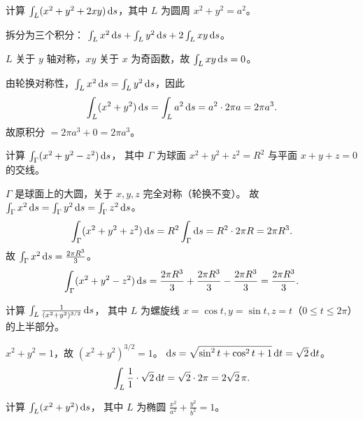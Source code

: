 \documentclass{article}
\begin{document}
\begin{exercise}
  计算 $\int_L (x^2 + y^2 + 2xy) \,\mathrm{d} s$，其中 $L$ 为圆周 $x^2+y^2=a^2$。
\end{exercise}

\begin{solution}
  拆分为三个积分：
  $\int_L x^2\,\mathrm{d} s + \int_L y^2\,\mathrm{d} s + 2\int_L xy\,\mathrm{d} s$。

  $L$ 关于 $y$ 轴对称，$xy$ 关于 $x$ 为奇函数，故 $\int_L xy\,\mathrm{d} s = 0$。

  由轮换对称性，$\int_L x^2\,\mathrm{d} s = \int_L y^2\,\mathrm{d} s$，因此
  \[
    \int_L (x^2+y^2)\,\mathrm{d} s = \int_L a^2 \,\mathrm{d} s = a^2 \cdot 2\pi a = 2\pi a^3.
  \]
  故原积分 $= 2\pi a^3 + 0 = 2\pi a^3$。
\end{solution}

\begin{exercise}
  计算 $\int_\Gamma (x^2 + y^2 - z^2) \,\mathrm{d} s$，
  其中 $\Gamma$ 为球面 $x^2+y^2+z^2=R^2$ 与平面 $x+y+z=0$ 的交线。
\end{exercise}

\begin{solution}
  $\Gamma$ 是球面上的大圆，关于 $x, y, z$ 完全对称（轮换不变）。
  故 $\int_\Gamma x^2\,\mathrm{d} s = \int_\Gamma y^2\,\mathrm{d} s = \int_\Gamma z^2\,\mathrm{d} s$。
  \[
    \int_\Gamma (x^2+y^2+z^2)\,\mathrm{d} s = R^2 \int_\Gamma \mathrm{d} s = R^2 \cdot 2\pi R = 2\pi R^3.
  \]
  故 $\int_\Gamma x^2\,\mathrm{d} s = \frac{2\pi R^3}{3}$。
  \[
    \int_\Gamma (x^2+y^2-z^2)\,\mathrm{d} s
    = \frac{2\pi R^3}{3} + \frac{2\pi R^3}{3} - \frac{2\pi R^3}{3}
    = \frac{2\pi R^3}{3}.
  \]
\end{solution}

\begin{exercise}
  计算 $\int_L \frac{1}{(x^2+y^2)^{3/2}} \,\mathrm{d} s$，
  其中 $L$ 为螺旋线 $x = \cos t, y = \sin t, z = t$（$0 \le t \le 2\pi$）的上半部分。
\end{exercise}

\begin{solution}
  $x^2+y^2 = 1$，故 $(x^2+y^2)^{3/2} = 1$。
  $\mathrm{d} s = \sqrt{\sin^2 t + \cos^2 t + 1}\,\mathrm{d} t = \sqrt{2}\,\mathrm{d} t$。
  \[
    \int_L \frac{1}{1} \cdot \sqrt{2} \,\mathrm{d} t
    = \sqrt{2} \cdot 2\pi = 2\sqrt{2}\,\pi.
  \]
\end{solution}

\begin{exercise}
  计算 $\int_L (x^2+y^2) \,\mathrm{d} s$，
  其中 $L$ 为椭圆 $\frac{x^2}{a^2}+\frac{y^2}{b^2}=1$。
\end{exercise}
\end{document}
